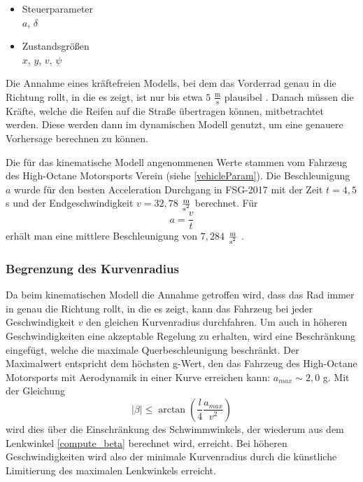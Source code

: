 \documentclass{like}
\begin{document}
\begin{itemize}
	\item Steuerparameter  \\
	\(a\), \(\delta\)
	\item Zustandsgrößen \\
	\(x\), \(y\), \(v\), \(\psi\)
	
\end{itemize}


Die Annahme eines kräftefreien Modells, bei dem das Vorderrad genau in die Richtung rollt, in die es zeigt, ist nur bis etwa $5$ $ \frac{\text{m}}{\text{s}}$ plausibel \cite{rajamani2011vehicle}. Danach müssen die Kräfte, welche die Reifen auf die Straße übertragen können, mitbetrachtet werden. Diese werden dann im dynamischen Modell genutzt, um eine genauere Vorhersage berechnen zu können.

Die für das kinematische Modell angenommenen Werte stammen vom Fahrzeug des High-Octane Motorsports Verein (siehe \ref{vehicleParam}). Die Beschleunigung \(a\) wurde für den besten Acceleration Durchgang in FSG-2017 mit der Zeit $t = 4,5$ s und der Endgeschwindigkeit $v = 32,78$ $ \frac{\text{m}}{\text{s\textsuperscript{2}}}$ berechnet. Für 
\begin{equation}
a = \frac{v}{t}  \label{long_acc_kin}
\end{equation}
erhält man eine mittlere Beschleunigung von $7,284$ $ \frac{\text{m}}{\text{s\textsuperscript{2}}}$ .


\subsubsection*{Begrenzung des Kurvenradius}
\label{betaMax}
Da beim kinematischen Modell die Annahme getroffen wird, dass das Rad immer in genau die Richtung rollt, in die es zeigt, kann das Fahrzeug bei jeder Geschwindigkeit \(v\) den gleichen Kurvenradius durchfahren. Um auch in höheren Geschwindigkeiten eine akzeptable Regelung zu erhalten, wird eine Beschränkung eingefügt, welche die maximale Querbeschleunigung beschränkt. Der Maximalwert entspricht dem höchsten g-Wert, den das Fahrzeug des High-Octane Motorsports mit Aerodynamik in einer Kurve erreichen kann: $a_{max} \sim 2,0$ g. 
Mit der Gleichung
\begin{equation}
	|\beta| \leq \arctan \left(\frac{l}{4} \frac{a_{max}}{v^2} \right)
\end{equation}
wird dies über die Einschränkung des Schwimmwinkels, der wiederum aus dem Lenkwinkel \ref{compute_beta} berechnet wird, erreicht. Bei höheren Geschwindigkeiten wird also der minimale Kurvenradius durch die künstliche Limitierung des maximalen Lenkwinkels erreicht. 
\end{document}
